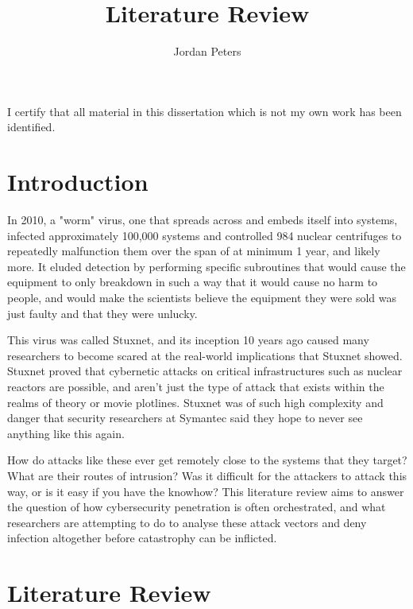 \documentclass[a4paper, 11pt]{article}
\title{Literature Review}
\author{Jordan Peters}
\begin{document}
\begin{titlepage}
    \maketitle
    I certify that all material in this dissertation which is not my own work has been identified.
\end{titlepage}

\tableofcontents


\pagebreak


\section{Introduction}
In 2010, a "worm" virus, one that spreads across and embeds itself into systems, infected approximately 100,000 systems \cite{ref:stuxnet2011report} and controlled 984 nuclear centrifuges to repeatedly malfunction them \cite{ref:singer2014cybersecurity} over the span of at minimum 1 year, and likely more. \cite{ref:stuxnet2011report} It eluded detection by performing specific subroutines that would cause the equipment to only breakdown in such a way that it would cause no harm to people, and would make the scientists believe the equipment they were sold was just faulty and that they were unlucky. \cite{ref:singer2014cybersecurity}

This virus was called Stuxnet, and its inception 10 years ago caused many researchers to become scared at the real-world implications that Stuxnet showed. \cite{ref:stuxnet2011report}\cite{ref:singer2014cybersecurity} Stuxnet proved that cybernetic attacks on critical infrastructures such as nuclear reactors are possible, and aren't just the type of attack that exists within the realms of theory or movie plotlines. \cite{ref:stuxnet2011report} Stuxnet was of such high complexity and danger that security researchers at Symantec said they hope to never see anything like this again. \cite{ref:stuxnet2011report}

How do attacks like these ever get remotely close to the systems that they target? What are their routes of intrusion? Was it difficult for the attackers to attack this way, or is it easy if you have the knowhow? This literature review aims to answer the question of how cybersecurity penetration is often orchestrated, and what researchers are attempting to do to analyse these attack vectors and deny infection altogether before catastrophy can be inflicted.

\section{Literature Review}
\end{document}
